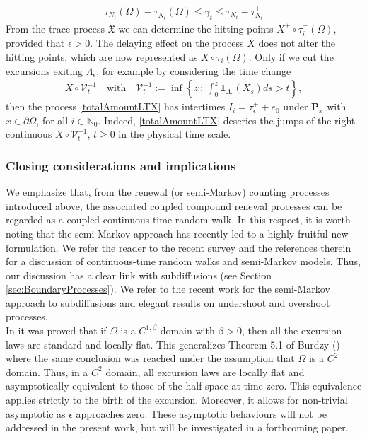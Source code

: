 \documentclass[11pt,a4paper]{article}
\begin{document}
{\begin{align*}
\tau_{N_t}(\Omega) - \tau^+_{N_t}(\Omega) \leq \gamma_t \leq \tau_{N_t} - \tau^+_{N_t}
\end{align*}
From the trace process $\mathfrak{X}$ we can determine the hitting points $X^+ \circ \tau^+_i(\Omega)$, provided that $\epsilon>0$. The delaying effect on the process $X$ does not alter the hitting points, which are now represented as $X \circ \tau_i(\Omega)$. Only if we cut the excursions exiting $\Lambda_\epsilon$, for example by considering the time change
\begin{align*}
X \circ \mathcal{V}^{-1}_t \quad \textrm{with} \quad \mathcal{V}^{-1}_t := \inf\left\{z\,:\, \int_0^z \mathbf{1}_{\Lambda_\epsilon}(X_s)ds >t \right\},
\end{align*}
then the process \eqref{totalAmountLTX} has intertimes $I_i = \tau^+_\epsilon + e_0$ under $\mathbf{P}_x$ with $x \in \partial \Omega$, for all $i \in \mathbb{N}_0$. Indeed, \eqref{totalAmountLTX} descries the jumps of the right-continuous $X \circ \mathcal{V}^{-1}_t$, $t \geq 0$ in the physical time scale. 


\subsubsection{Closing considerations and implications}

We emphasize that, from the renewal (or semi-Markov) counting processes introduced above, the associated coupled compound renewal processes can be regarded as a coupled continuous-time random walk. In this respect, it is worth noting that the semi-Markov approach has recently led to a highly fruitful new formulation. We refer the reader to the recent survey \cite{BioToaCTRWs} and the references therein for a discussion of continuous-time random walks and semi-Markov models. Thus, our discussion has a clear link with subdiffusions (see Section \ref{sec:BoundaryProcesses}). We refer to the recent work \cite{BioCe-GiToa26} for the semi-Markov approach to subdiffusions and elegant results on undershoot and overshoot processes.\\

In \cite[Theorem 3.1]{BurdzyWillTRANS86} it was proved that if $\Omega$ is a $C^{1,\beta}$-domain with $\beta>0$, then all the excursion laws are standard and locally flat. This generalizes Theorem 5.1 of Burdzy (\cite{BurdzyTRANS86}) where the same conclusion was reached under the assumption that $\Omega$ is a $C^2$ domain.  Thus, in a $C^2$ domain, all excursion laws are locally flat and asymptotically equivalent to those of the half-space at time zero. This equivalence applies strictly to the birth of the excursion. Moreover, it allows for non-trivial asymptotic as $\epsilon$ approaches zero. These asymptotic behaviours will not be addressed in the present work, but will be investigated in a forthcoming paper. \\


}
\end{document}
